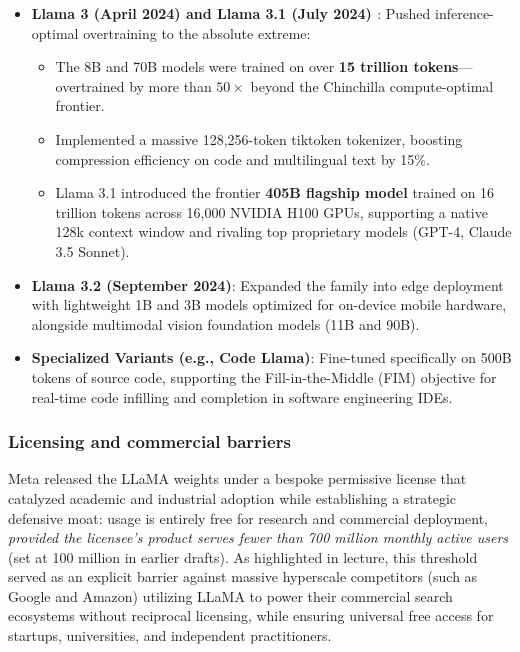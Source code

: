 \documentclass[../../main.tex]{subfiles}
\begin{document}
\begin{itemize}
    \item \textbf{Llama 3 (April 2024) and Llama 3.1 (July 2024) \cite{dubey2024llama3}}:
    Pushed inference-optimal overtraining to the absolute extreme:
    \begin{itemize}
        \item The 8B and 70B models were trained on over \textbf{15 trillion tokens}---overtrained by more than $50\times$ beyond the Chinchilla compute-optimal frontier.
        \item Implemented a massive 128,256-token tiktoken tokenizer, boosting compression efficiency on code and multilingual text by 15\%.
        \item Llama 3.1 introduced the frontier \textbf{405B flagship model} trained on 16 trillion tokens across 16,000 NVIDIA H100 GPUs, supporting a native 128k context window and rivaling top proprietary models (GPT-4, Claude 3.5 Sonnet).
    \end{itemize}

    \item \textbf{Llama 3.2 (September 2024)}:
    Expanded the family into edge deployment with lightweight 1B and 3B models optimized for on-device mobile hardware, alongside multimodal vision foundation models (11B and 90B).
    
    \item \textbf{Specialized Variants (e.g., Code Llama)}:
    Fine-tuned specifically on 500B tokens of source code, supporting the Fill-in-the-Middle (FIM) objective for real-time code infilling and completion in software engineering IDEs.
\end{itemize}

\subsubsection{Licensing and commercial barriers}
Meta released the LLaMA weights under a bespoke permissive license that catalyzed academic and industrial adoption while establishing a strategic defensive moat: usage is entirely free for research and commercial deployment, \emph{provided the licensee's product serves fewer than 700 million monthly active users} (set at 100 million in earlier drafts). As highlighted in lecture, this threshold served as an explicit barrier against massive hyperscale competitors (such as Google and Amazon) utilizing LLaMA to power their commercial search ecosystems without reciprocal licensing, while ensuring universal free access for startups, universities, and independent practitioners.
\end{document}
